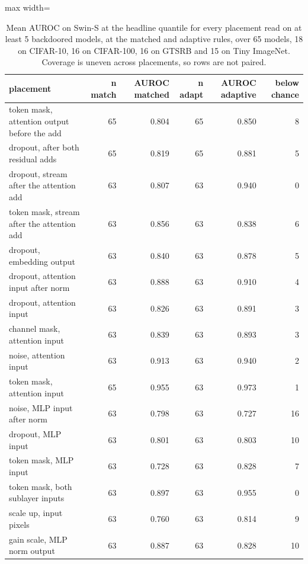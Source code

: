 \begin{table}[htbp]
\centering
\small
\caption{Mean AUROC on Swin-S at the headline quantile for every placement read on at least 5 backdoored models, at the matched and adaptive rules, over 65 models, 18 on CIFAR-10, 16 on CIFAR-100, 16 on GTSRB and 15 on Tiny ImageNet. Coverage is uneven across placements, so rows are not paired.}
\label{tab:swin-placements}
\begin{adjustbox}{max width=\linewidth}
\begin{tabular}{lrrrrr}
\toprule
placement & n match & AUROC matched & n adapt & AUROC adaptive & below chance \\
\midrule
token mask, attention output before the add & 65 & 0.804 & 65 & 0.850 & 8 \\
dropout, after both residual adds & 65 & 0.819 & 65 & 0.881 & 5 \\
dropout, stream after the attention add & 63 & 0.807 & 63 & 0.940 & 0 \\
token mask, stream after the attention add & 63 & 0.856 & 63 & 0.838 & 6 \\
dropout, embedding output & 63 & 0.840 & 63 & 0.878 & 5 \\
dropout, attention input after norm & 63 & 0.888 & 63 & 0.910 & 4 \\
dropout, attention input & 63 & 0.826 & 63 & 0.891 & 3 \\
channel mask, attention input & 63 & 0.839 & 63 & 0.893 & 3 \\
noise, attention input & 63 & 0.913 & 63 & 0.940 & 2 \\
token mask, attention input & 65 & 0.955 & 63 & 0.973 & 1 \\
noise, MLP input after norm & 63 & 0.798 & 63 & 0.727 & 16 \\
dropout, MLP input & 63 & 0.801 & 63 & 0.803 & 10 \\
token mask, MLP input & 63 & 0.728 & 63 & 0.828 & 7 \\
token mask, both sublayer inputs & 63 & 0.897 & 63 & 0.955 & 0 \\
scale up, input pixels & 63 & 0.760 & 63 & 0.814 & 9 \\
gain scale, MLP norm output & 63 & 0.887 & 63 & 0.828 & 10 \\

\end{tabular}
\end{adjustbox}
\end{table}
